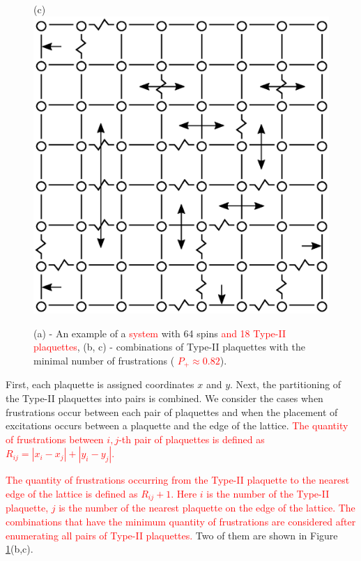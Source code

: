 \documentclass[preprint,12pt]{elsarticle}
\begin{document}
\begin{figure}[H]
\begin{minipage}[h]{0.3\linewidth}
		\end{minipage}
		\hspace{10pt}
		\begin{minipage}[h]{0.3\linewidth}
			\centering(c)
			\includegraphics[width=1\linewidth]{pictures/2PS_cell64_J72_5.eps}
		\end{minipage}
		\caption{(a) - An example of a \textcolor{red}{system} with 64 spins \textcolor{red}{and 18 Type-II plaquettes}, (b, c) - combinations of Type-II plaquettes with the minimal number of frustrations (\textcolor{red}{  $P_+\approx0.82$}).}
		\label{fig:12PS_cell64_J72_5}
	\end{figure}
	
	
	First, each plaquette is assigned coordinates $x$ and $y$. Next, the partitioning of the Type-II plaquettes into pairs is combined. We consider the cases when frustrations occur between each pair of plaquettes and when the placement of excitations occurs between a plaquette and the edge of the lattice. \textcolor{red}{The quantity of frustrations between $i,j$-th pair of plaquettes is defined as $R_{ij} = \left|x_i-x_j\right|+\left|y_i-y_j\right|$.}
	
	\textcolor{red}{The quantity of frustrations occurring from the Type-II plaquette to the nearest edge of the lattice is defined as $R_{ij}+1$. Here $i$ is the number of the Type-II plaquette, $j$ is the number of the nearest plaquette on the edge of the lattice. The combinations that have the minimum quantity of frustrations are considered after enumerating all pairs of Type-II plaquettes.} Two of them are shown in Figure \ref{fig:12PS_cell64_J72_5}(b,c).
	
\end{document}
